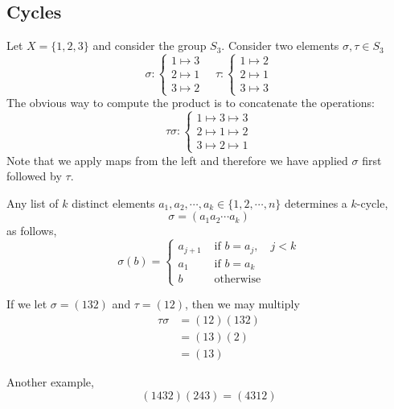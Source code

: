 \documentclass{article}
\begin{document}
\subsection{Cycles}
\begin{eg}
    Let $X = \{1, 2, 3\}$ and consider the group $S_3$. Consider two elements $\sigma, \tau \in S_3$
    \[
        \sigma: \begin{cases}
            1 \mapsto 3 \\
            2 \mapsto 1 \\
            3 \mapsto 2
        \end{cases}
        \quad
        \tau: \begin{cases}
            1 \mapsto 2 \\
            2 \mapsto 1 \\
            3 \mapsto 3
        \end{cases}
    \]
    The obvious way to compute the product is to concatenate the operations:
    \[
        \tau\sigma: \begin{cases}
            1 \mapsto 3 \mapsto 3 \\
            2 \mapsto 1 \mapsto 2 \\
            3 \mapsto 2 \mapsto 1
        \end{cases}
    \]
    Note that we apply maps from the left and therefore we have applied $\sigma$ first followed by $\tau$.
\end{eg}

\begin{defi}
    Any list of $k$ distinct elements $a_1, a_2, \cdots, a_k \in \{1, 2, \cdots, n\}$ determines a $k$-cycle, 
    \[
        \sigma = (a_1 a_2 \cdots a_k)  
    \] as follows,
    \[
        \sigma(b) = \begin{cases}
            a_{j+1} & \text{ if } b = a_j, \quad j < k \\
            a_1 & \text{ if } b = a_k \\
            b & \text{ otherwise }
        \end{cases}  
    \]
\end{defi}

\begin{eg}
    If we let $\sigma = (1 3 2)$ and $\tau = (1 2)$, then we may multiply
    \begin{align*}
        \tau \sigma &= (1 2)(1 3 2) \\
        &= (1 3)(2) \\
        &= (1 3)  
    \end{align*}

    Another example, 
    \[
        (1 4 3 2)(2 4 3) = (4 3 1 2)  
    \]
\end{eg}
\end{document}
